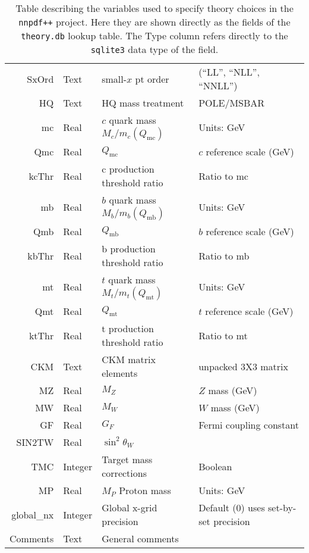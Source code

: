 \documentclass[11pt]{article}
\begin{document}
\begin{table}[htp]
\begin{center}
\begin{tabular}{|r|l|l|p{50mm}|}
  SxOrd     & Text    & small-$x$ pt order             & (``LL'', ``NLL'', ``NNLL'') \\
  HQ        & Text    & HQ mass treatment              & POLE/MSBAR \\
  mc        & Real    & $c$ quark mass $M_c/m_c(Q_{\mathrm{mc}})$   & Units: GeV \\
  Qmc       & Real    & $Q_{\mathrm{mc}}$ & $c$ reference scale (GeV)\\
  kcThr     & Real    & c production threshold ratio & Ratio to mc\\
  mb        & Real    & $b$ quark mass $M_b/m_b(Q_{\mathrm{mb}})$   & Units: GeV \\
  Qmb       & Real    & $Q_{\mathrm{mb}}$ & $b$ reference scale (GeV)\\
  kbThr     & Real    & b production threshold ratio & Ratio to mb\\
  mt        & Real    & $t$ quark mass $M_t/m_t(Q_{\mathrm{mt}})$   & Units: GeV \\
  Qmt       & Real    & $Q_{\mathrm{mt}}$ & $t$ reference scale (GeV)\\
  ktThr     & Real    & t production threshold ratio & Ratio to mt\\
  CKM       & Text    & CKM matrix elements            & unpacked 3X3 matrix \\ \pagebreak
  MZ        & Real    & $M_Z$                          & $Z$ mass (GeV) \\
  MW        & Real    & $M_W$                          & $W$ mass (GeV) \\
  GF        & Real    & $G_F$                          & Fermi coupling constant \\
  SIN2TW    & Real    & $\sin^2\theta_W$               & \\
  TMC       & Integer & Target mass corrections        & Boolean \\
  MP        & Real    & $M_P$ Proton mass              & Units: GeV \\
  global\_nx& Integer & Global x-grid precision        & Default (0) uses set-by-set precision \\
  Comments  & Text    & General comments               & \\
\hline
\end{tabular}
\caption{Table describing the variables used to specify theory choices in the
{\tt nnpdf++} project. Here they are shown directly as the fields of the {\tt
theory.db} lookup table. The Type column refers directly to the {\tt sqlite3}
data type of the field.}\label{tab:theoryparams}
\end{center}
\end{table}%
\end{document}

